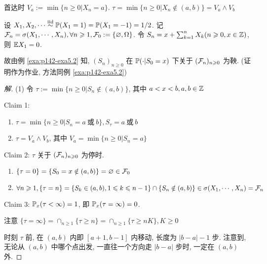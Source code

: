 首达时 $V_a:=\min\{n\geq 0|X_n=a\}$. $\tau=\min\{n\geq 0|X_n\notin (a,b)\}=V_a\land V_b$

\begin{example}[公平游戏中的赌徒破产]\label{exa:p151-exa1}
    设 $X_1,X_2,\cdots\overset{\text{iid}}{\sim} \mathbb{P}(X_1=1)=\mathbb{P}(X_1=-1)=1/2$. 记 $\mathcal{F}_n=\sigma(X_1,\cdots, X_n), \forall n\geqslant 1, \mathcal{F}_0:=\{\varnothing, \Omega\}$. 令 $S_n=x+\sum_{k=1}^n X_k (n\geqslant 0, x\in \mathbb{Z})$, 则 $\mathbb E X_1=0$.

    故由例 \ref{exa:p142-exa5.2} 知, $(S_n)_{n\geq 0}$ 在 $\mathbb{P}(\cdot| S_0=x)$ 下关于 $(\mathcal{F}_n)_{n\geqslant 0}$ 为鞅. (证明作为作业, 方法同例 \ref{exa:p142-exa5.2})
\end{example}

\begin{proof}[解]
(1) 令 $\tau:=\min\{n\geq 0|S_n\notin (a,b)\}$, 其中 $a<x<b,a,b\in\mathbb{Z}$

Claim 1:
\begin{enumerate}
    \item $\tau=\min\{n\geq 0| S_n=a\ \text{或}\ b\}, S_{\tau}=a\ \text{或}\ b$
    \item $\tau=V_a\land V_b$, 其中 $V_a=\min\{n\geq 0|S_n=a\}$
\end{enumerate} 

Claim 2: $\tau$ 关于 $(\mathcal{F}_n)_{n\geqslant 0}$ 为停时.
\begin{enumerate}
    \item $\{\tau=0\}=\{S_0=x\notin (a,b)\}=\varnothing\in \mathcal{F}_0$
    \item $\forall n\geqslant 1, \{\tau=n\}=\{S_k\in (a,b),1\leqslant k\leqslant n-1\}\cap \{S_n\notin (a,b)\}\in \sigma(X_1,\cdots,X_n)=\mathcal{F}_n$
\end{enumerate}

Claim 3: $\mathbb{P}_x(\tau<\infty)=1$, 即 $\mathbb{P}_x(\tau=\infty)=0$. 

注意 $\{\tau=\infty\}=\cap_{n\geq 1}\{\tau\geq n\}=\cap_{n\geq 1}\{\tau\geq nK\},K\geq 0$ 

时刻 $\tau$ 前, 在 $(a,b)$ 内即 $[a+1,b-1]$ 内移动, 长度为 $|b-a|-1$ 步. 注意到, 无论从 $(a,b)$ 中哪个点出发, 一直往一个方向走 $|b-a|$ 步时, 一定在 $(a,b)$ 外.


\end{proof}
